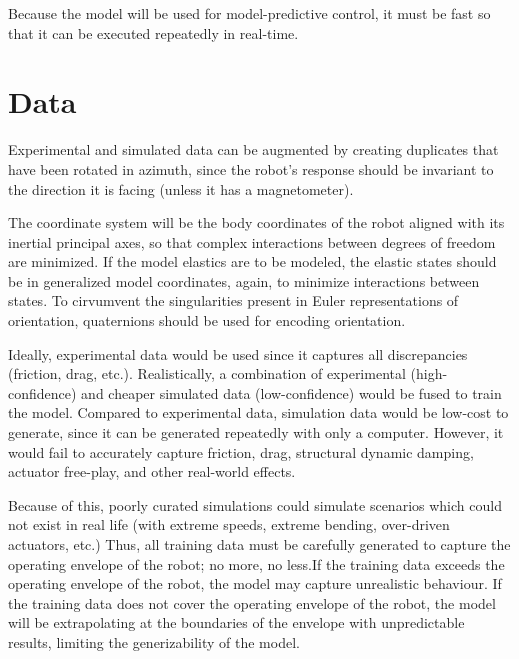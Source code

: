 \documentclass[11pt]{article}
\begin{document}
Because the model will be used for model-predictive control, it must be fast so that it can be executed repeatedly in real-time.

\section{Data}

Experimental and simulated data can be augmented by creating duplicates that have been rotated in azimuth, since the robot's response should be invariant to the direction it is facing (unless it has a magnetometer).

The coordinate system will be the body coordinates of the robot aligned with its inertial principal axes, so that complex interactions between degrees of freedom are minimized. If the model elastics are to be modeled, the elastic states should be in generalized model coordinates, again, to minimize interactions between states. To cirvumvent the singularities present in Euler representations of orientation, quaternions should be used for encoding orientation.

Ideally, experimental data would be used since it captures all discrepancies (friction, drag, etc.). Realistically, a combination of experimental (high-confidence) and cheaper simulated data (low-confidence) would be fused to train the model. Compared to experimental data, simulation data would be low-cost to generate, since it can be generated repeatedly with only a computer. However, it would fail to accurately capture friction, drag, structural dynamic damping, actuator free-play, and other real-world effects.

Because of this, poorly curated simulations could simulate scenarios which could not exist in real life (with extreme speeds, extreme bending, over-driven actuators, etc.) Thus, all training data must be carefully generated to capture the operating envelope of the robot; no more, no less.If the training data exceeds the operating envelope of the robot, the model may capture unrealistic behaviour. If the training data does not cover the operating envelope of the robot, the model will be extrapolating at the boundaries of the envelope with unpredictable results, limiting the generizability of the model.

\end{document}
